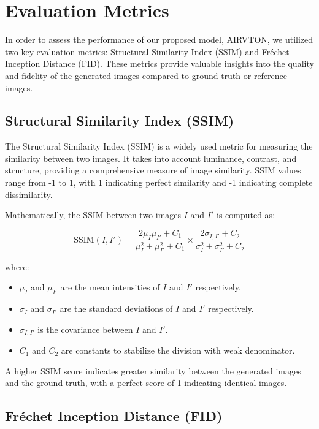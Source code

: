 \section{Evaluation Metrics}

In order to assess the performance of our proposed model, AIRVTON, we utilized two key evaluation metrics: Structural Similarity Index (SSIM) and Fréchet Inception Distance (FID). These metrics provide valuable insights into the quality and fidelity of the generated images compared to ground truth or reference images.

\subsection{Structural Similarity Index (SSIM)}

The Structural Similarity Index (SSIM) is a widely used metric for measuring the similarity between two images. It takes into account luminance, contrast, and structure, providing a comprehensive measure of image similarity. SSIM values range from -1 to 1, with 1 indicating perfect similarity and -1 indicating complete dissimilarity.

Mathematically, the SSIM between two images \(I\) and \(I'\) is computed as:

\[
\text{SSIM}(I, I') = \frac{{2 \mu_I \mu_{I'} + C_1}}{{\mu_I^2 + \mu_{I'}^2 + C_1}} \times \frac{{2 \sigma_{I,I'} + C_2}}{{\sigma_I^2 + \sigma_{I'}^2 + C_2}}
\]

where:
\begin{itemize}
  \item \(\mu_I\) and \(\mu_{I'}\) are the mean intensities of \(I\) and \(I'\) respectively.
  \item \(\sigma_I\) and \(\sigma_{I'}\) are the standard deviations of \(I\) and \(I'\) respectively.
  \item \(\sigma_{I,I'}\) is the covariance between \(I\) and \(I'\).
  \item \(C_1\) and \(C_2\) are constants to stabilize the division with weak denominator.
\end{itemize}

A higher SSIM score indicates greater similarity between the generated images and the ground truth, with a perfect score of 1 indicating identical images.

\subsection{Fréchet Inception Distance (FID)}

